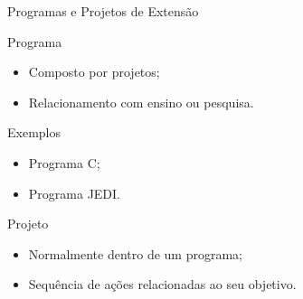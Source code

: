 \begin{frame}{{\sffamily Programas e Projetos de Extensão}}
\begin{block}{Programa}
\begin{itemize}
    \item Composto por projetos; %
    \item Relacionamento com ensino ou pesquisa. 
\end{itemize}
\end{block}

\begin{block}{Exemplos}
\begin{itemize}
    \item Programa C;
    \item Programa JEDI.
\end{itemize}
\end{block}

\begin{block}{Projeto}
    \begin{itemize}
        \item Normalmente dentro de um programa;
        \item Sequência de ações relacionadas ao seu objetivo. %
    \end{itemize}
\end{block}

\end{frame}



